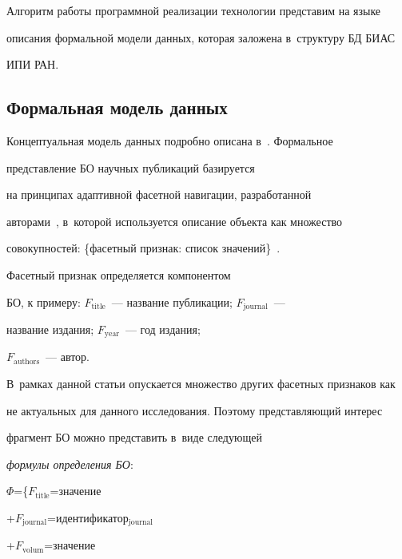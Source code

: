 {  Алгоритм работы программной реализации технологии представим на языке


описания формальной модели данных, которая заложена в~структуру БД БИАС


ИПИ РАН.





\subsection{Формальная модель данных}





  Концептуальная модель данных подробно описана в~\cite{6-o}. Формальное


представление БО научных публикаций базируется


на принципах адаптивной фасетной навигации, разработанной


авторами~\cite{7-o}, в~которой используется описание объекта как множество


совокупностей: \{фасетный признак: список значений\}~\cite{8-o}.





  Фасетный признак определяется компонентом


БО, к примеру: $F_{\mathrm{title}}$~--- название публикации; $F_{\mathrm{journal}}$~---


название издания; $F_{\mathrm{year}}$~--- год издания;


$F_{\mathrm{authors}}$~--- автор.


В~рамках данной статьи опускается множество других фасетных признаков как


не актуальных для данного исследования. Поэтому представляющий интерес


фрагмент БО можно представить в~виде следующей


\textit{формулы определения БО}:





$\Phi$\;=\;\{$F_{\mathrm{title}}$\;=\;значение





+\;$F_{\mathrm{journal}}$\;=\;идентификатор$_{\mathrm{journal}}$





+\;$F_{\mathrm{volum}}$\;=\;значение





}
